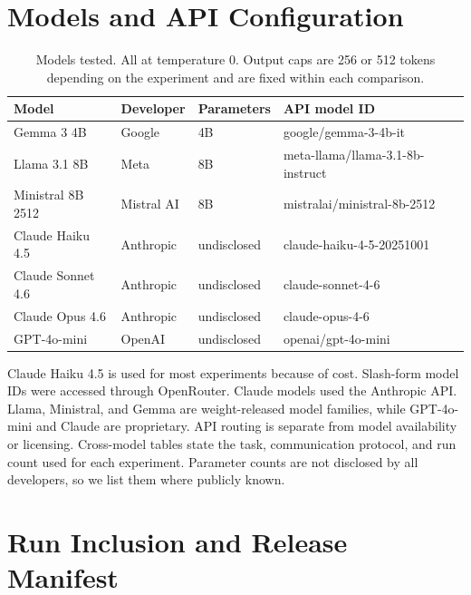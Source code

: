 \section{Models and API Configuration}
\label{app:models}

\begin{table}[htbp]
\caption{Models tested. All at temperature 0. Output caps are 256 or 512 tokens depending on the experiment and are fixed within each comparison.}
\label{tab:models}
\begin{center}
\small
\begin{tabular}{llll}
\toprule
Model & Developer & Parameters & API model ID \\
\midrule
Gemma 3 4B & Google & 4B & google/gemma-3-4b-it \\
Llama 3.1 8B & Meta & 8B & meta-llama/llama-3.1-8b-instruct \\
Ministral 8B 2512 & Mistral AI & 8B & mistralai/ministral-8b-2512 \\
Claude Haiku 4.5 & Anthropic & undisclosed & claude-haiku-4-5-20251001 \\
Claude Sonnet 4.6 & Anthropic & undisclosed & claude-sonnet-4-6 \\
Claude Opus 4.6 & Anthropic & undisclosed & claude-opus-4-6 \\
GPT-4o-mini & OpenAI & undisclosed & openai/gpt-4o-mini \\
\bottomrule
\end{tabular}
\end{center}
\end{table}

Claude Haiku 4.5 is used for most experiments because of cost. Slash-form model IDs were accessed through OpenRouter. Claude models used the Anthropic API. Llama, Ministral, and Gemma are weight-released model families, while GPT-4o-mini and Claude are proprietary. API routing is separate from model availability or licensing. Cross-model tables state the task, communication protocol, and run count used for each experiment. Parameter counts are not disclosed by all developers, so we list them where publicly known.

\section{Run Inclusion and Release Manifest}
\label{app:scale}
\enlargethispage{4\baselineskip}

